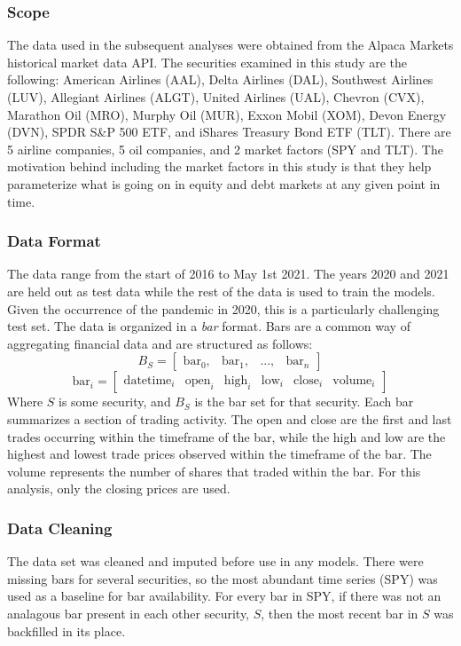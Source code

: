 \documentclass{article}
\begin{document}
\subsubsection{Scope}
The data used in the subsequent analyses were obtained from the Alpaca Markets historical 
market data API. The securities examined in this study are the following: American Airlines
(AAL), Delta Airlines (DAL), Southwest Airlines (LUV), Allegiant Airlines (ALGT), United
Airlines (UAL), Chevron (CVX), Marathon Oil (MRO), Murphy Oil (MUR), Exxon Mobil (XOM),
Devon Energy (DVN), SPDR S\&P 500 ETF, and iShares Treasury Bond ETF (TLT). There 
are 5 airline companies, 5 oil companies, and 2 market factors (SPY and TLT). The motivation
behind including the market factors in this study is that they help parameterize what is going
on in equity and debt markets at any given point in time.
\subsubsection{Data Format}
The data range from
the start of 2016 to May 1st 2021. The years 2020 and 2021 are held out as test data while the
rest of the data is used to train the models. Given the occurrence of the pandemic in 2020,
this is a particularly challenging test set. The data is organized in a \textit{bar} format.
Bars are a common way of aggregating financial data and are structured as follows:
$$B_{S} = \begin{bmatrix} \mathrm{bar}_0, & \mathrm{bar}_1, & 
    ..., & \mathrm{bar}_n \end{bmatrix}$$
$$\mathrm{bar}_i = \begin{bmatrix} \mathrm{datetime}_i & \mathrm{open}_i & 
    \mathrm{high}_i & \mathrm{low}_i & \mathrm{close}_i & \mathrm{volume}_i 
\end{bmatrix}$$
Where $S$ is some security, and $B_S$ is the bar set for that security. Each bar summarizes
a section of trading activity. The open and close are the first and last trades occurring within
the timeframe of the bar, while the high and low are the highest and lowest trade prices 
observed within the timeframe of the bar. The volume represents the number of shares that
traded within the bar. For this analysis, only the closing prices are used.
\subsubsection{Data Cleaning}
The data set was cleaned and imputed before use in any models. There were missing bars 
for several securities, so the most abundant time series (SPY) was used as a baseline for 
bar availability. For every bar in SPY, if there was not an analagous bar present in each 
other security, $S$, then the most recent bar in $S$ was backfilled in its place. 
\end{document}
